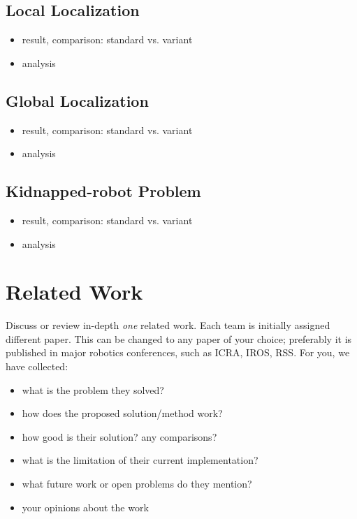 \documentclass[letterpaper, 10 pt, conference]{ieeeconf}  %
\begin{document}
\subsection{Local Localization}
\begin{itemize}
\item result, comparison: standard vs. variant
\item analysis
\end{itemize}

\subsection{Global Localization}
\begin{itemize}
\item result, comparison: standard vs. variant
\item analysis
\end{itemize}

\subsection{Kidnapped-robot Problem}
\begin{itemize}
\item result, comparison: standard vs. variant
\item analysis
\end{itemize}

\section{Related Work}
Discuss or review in-depth \emph{one} related work.
Each team is initially assigned different paper.
This can be changed to any paper of your choice; preferably it is published in major robotics conferences, such as ICRA, IROS, RSS.
For you, we have collected: \cite{1389783, 5354298, 5509950, 6696380, 6094843, 4059089}
\begin{itemize}
    \item what is the problem they solved?
    \item how does the proposed solution/method work?
    \item how good is their solution? any comparisons?
    \item what is the limitation of their current implementation?
    \item what future work or open problems do they mention?
    \item your opinions about the work
\end{itemize}
\end{document}
